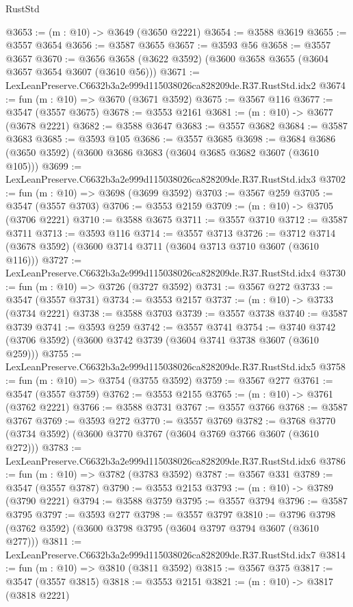 \begin{lexlean}{RustStd}
\begin{coremodule}
@3653 := (m : @10) -> @3649 (@3650 @2221)
@3654 := @3588 @3619
@3655 := @3557 @3654
@3656 := @3587 @3655
@3657 := @3593 @56
@3658 := @3557 @3657
@3670 := @3656 @3658 (@3622 @3592) (@3600 @3658 @3655 (@3604 @3657 @3654 @3607 (@3610 @56)))
@3671 := LexLeanPreserve.C6632b3a2e999d115038026ca828209de.R37.RustStd.idx2
@3674 := fun (m : @10) => @3670 (@3671 @3592)
@3675 := @3567 @116
@3677 := @3547 (@3557 @3675)
@3678 := @3553 @2161
@3681 := (m : @10) -> @3677 (@3678 @2221)
@3682 := @3588 @3647
@3683 := @3557 @3682
@3684 := @3587 @3683
@3685 := @3593 @105
@3686 := @3557 @3685
@3698 := @3684 @3686 (@3650 @3592) (@3600 @3686 @3683 (@3604 @3685 @3682 @3607 (@3610 @105)))
@3699 := LexLeanPreserve.C6632b3a2e999d115038026ca828209de.R37.RustStd.idx3
@3702 := fun (m : @10) => @3698 (@3699 @3592)
@3703 := @3567 @259
@3705 := @3547 (@3557 @3703)
@3706 := @3553 @2159
@3709 := (m : @10) -> @3705 (@3706 @2221)
@3710 := @3588 @3675
@3711 := @3557 @3710
@3712 := @3587 @3711
@3713 := @3593 @116
@3714 := @3557 @3713
@3726 := @3712 @3714 (@3678 @3592) (@3600 @3714 @3711 (@3604 @3713 @3710 @3607 (@3610 @116)))
@3727 := LexLeanPreserve.C6632b3a2e999d115038026ca828209de.R37.RustStd.idx4
@3730 := fun (m : @10) => @3726 (@3727 @3592)
@3731 := @3567 @272
@3733 := @3547 (@3557 @3731)
@3734 := @3553 @2157
@3737 := (m : @10) -> @3733 (@3734 @2221)
@3738 := @3588 @3703
@3739 := @3557 @3738
@3740 := @3587 @3739
@3741 := @3593 @259
@3742 := @3557 @3741
@3754 := @3740 @3742 (@3706 @3592) (@3600 @3742 @3739 (@3604 @3741 @3738 @3607 (@3610 @259)))
@3755 := LexLeanPreserve.C6632b3a2e999d115038026ca828209de.R37.RustStd.idx5
@3758 := fun (m : @10) => @3754 (@3755 @3592)
@3759 := @3567 @277
@3761 := @3547 (@3557 @3759)
@3762 := @3553 @2155
@3765 := (m : @10) -> @3761 (@3762 @2221)
@3766 := @3588 @3731
@3767 := @3557 @3766
@3768 := @3587 @3767
@3769 := @3593 @272
@3770 := @3557 @3769
@3782 := @3768 @3770 (@3734 @3592) (@3600 @3770 @3767 (@3604 @3769 @3766 @3607 (@3610 @272)))
@3783 := LexLeanPreserve.C6632b3a2e999d115038026ca828209de.R37.RustStd.idx6
@3786 := fun (m : @10) => @3782 (@3783 @3592)
@3787 := @3567 @331
@3789 := @3547 (@3557 @3787)
@3790 := @3553 @2153
@3793 := (m : @10) -> @3789 (@3790 @2221)
@3794 := @3588 @3759
@3795 := @3557 @3794
@3796 := @3587 @3795
@3797 := @3593 @277
@3798 := @3557 @3797
@3810 := @3796 @3798 (@3762 @3592) (@3600 @3798 @3795 (@3604 @3797 @3794 @3607 (@3610 @277)))
@3811 := LexLeanPreserve.C6632b3a2e999d115038026ca828209de.R37.RustStd.idx7
@3814 := fun (m : @10) => @3810 (@3811 @3592)
@3815 := @3567 @375
@3817 := @3547 (@3557 @3815)
@3818 := @3553 @2151
@3821 := (m : @10) -> @3817 (@3818 @2221)

\end{coremodule}
\end{lexlean}
